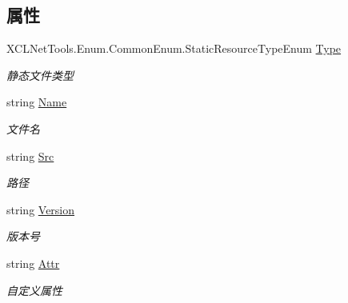 \subsection*{属性}
\begin{DoxyCompactItemize}
\item 
X\+C\+L\+Net\+Tools.\+Enum.\+Common\+Enum.\+Static\+Resource\+Type\+Enum \hyperlink{class_x_c_l_net_tools_1_1_entity_1_1_static_resource_a182146de67a26e9ab0efdd2e8e3460dc}{Type}
\begin{DoxyCompactList}\small\item\em 静态文件类型 \end{DoxyCompactList}\item 
string \hyperlink{class_x_c_l_net_tools_1_1_entity_1_1_static_resource_a8e114996e0fb52d9543e5b018e0d09e5}{Name}
\begin{DoxyCompactList}\small\item\em 文件名 \end{DoxyCompactList}\item 
string \hyperlink{class_x_c_l_net_tools_1_1_entity_1_1_static_resource_a956fb610dd51730bbe8aac6a04d72da3}{Src}
\begin{DoxyCompactList}\small\item\em 路径 \end{DoxyCompactList}\item 
string \hyperlink{class_x_c_l_net_tools_1_1_entity_1_1_static_resource_a4b85a7d2f6dc6169a10ebfe2987f2404}{Version}
\begin{DoxyCompactList}\small\item\em 版本号 \end{DoxyCompactList}\item 
string \hyperlink{class_x_c_l_net_tools_1_1_entity_1_1_static_resource_a7541eec0c18e1aac9a8d0c980f1c7b35}{Attr}
\begin{DoxyCompactList}\small\item\em 自定义属性 \end{DoxyCompactList}\end{DoxyCompactItemize}


